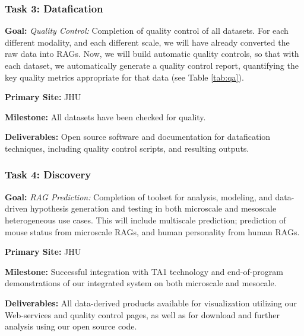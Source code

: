 \subsubsection{Task 3: Datafication}
\begin{compactitem}
\item \textbf{Goal:} \emph{Quality Control:} Completion of quality control of all datasets.  For each different modality, and each different scale, we will have already converted the raw data into RAGs.  Now, we will build automatic quality controls, so that with each dataset, we automatically generate a quality control report, quantifying the key quality metrics appropriate for that data (see Table \ref{tab:qa}).   
\item \textbf{Primary Site:} JHU
\item \textbf{Milestone:} All datasets have been checked for quality.
\item \textbf{Deliverables:} Open source software and documentation for datafication techniques, including quality control scripts, and resulting outputs.
\end{compactitem}


\subsubsection{Task 4: Discovery}
\begin{compactitem}
\item \textbf{Goal:} \emph{RAG Prediction:} Completion of toolset for analysis, modeling, and data-driven hypothesis generation and testing in both microscale and mesoscale heterogeneous use cases. This will include multiscale prediction; prediction of mouse status from microscale RAGs, and human personality from human RAGs.
\item \textbf{Primary Site:} JHU
\item \textbf{Milestone:} Successful integration with TA1 technology and end-of-program demonstrations of our integrated system on both microscale and mesocale.
\item \textbf{Deliverables:} All data-derived products available for visualization utilizing our Web-services and quality control pages, as well as for download and further analysis using our open source code.
\end{compactitem}


